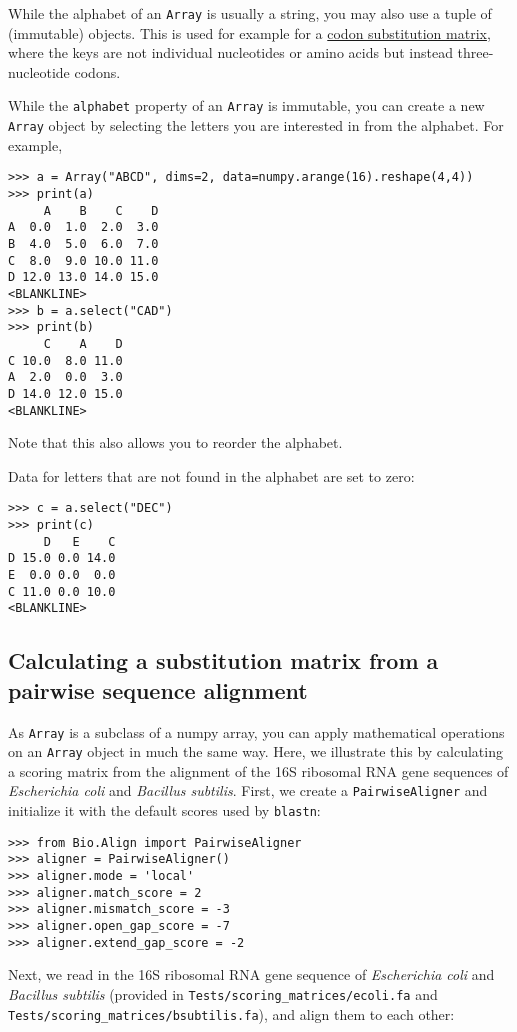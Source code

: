 While the alphabet of an \verb+Array+ is usually a string, you may also use a tuple of (immutable) objects. This is used for example for a \hyperlink{codonmatrix}{codon substitution matrix}, where the keys are not individual nucleotides or amino acids but instead three-nucleotide codons.

While the \verb+alphabet+ property of an \verb+Array+ is immutable, you can create a new \verb+Array+ object by selecting the letters you are interested in from the alphabet. For example,
\begin{verbatim}
>>> a = Array("ABCD", dims=2, data=numpy.arange(16).reshape(4,4))
>>> print(a)
     A    B    C    D
A  0.0  1.0  2.0  3.0
B  4.0  5.0  6.0  7.0
C  8.0  9.0 10.0 11.0
D 12.0 13.0 14.0 15.0
<BLANKLINE>
>>> b = a.select("CAD")
>>> print(b)
     C    A    D
C 10.0  8.0 11.0
A  2.0  0.0  3.0
D 14.0 12.0 15.0
<BLANKLINE>
\end{verbatim}
Note that this also allows you to reorder the alphabet.

Data for letters that are not found in the alphabet are set to zero:
\begin{verbatim}
>>> c = a.select("DEC")
>>> print(c)
     D   E    C
D 15.0 0.0 14.0
E  0.0 0.0  0.0
C 11.0 0.0 10.0
<BLANKLINE>
\end{verbatim}

\subsection*{Calculating a substitution matrix from a pairwise sequence alignment}

As \verb+Array+ is a subclass of a numpy array, you can apply mathematical operations on an \verb+Array+ object in much the same way. Here, we illustrate this by calculating a scoring matrix from the alignment of the 16S ribosomal RNA gene sequences of {\it Escherichia coli} and {\it Bacillus subtilis}. First, we create a \verb+PairwiseAligner+ and initialize it with the default scores used by \verb+blastn+:

\begin{verbatim}
>>> from Bio.Align import PairwiseAligner
>>> aligner = PairwiseAligner()
>>> aligner.mode = 'local'
>>> aligner.match_score = 2
>>> aligner.mismatch_score = -3
>>> aligner.open_gap_score = -7
>>> aligner.extend_gap_score = -2
\end{verbatim}
Next, we read in the 16S ribosomal RNA gene sequence of {\it Escherichia coli} and {\it Bacillus subtilis} (provided in \verb+Tests/scoring_matrices/ecoli.fa+ and \verb+Tests/scoring_matrices/bsubtilis.fa+), and align them to each other:


